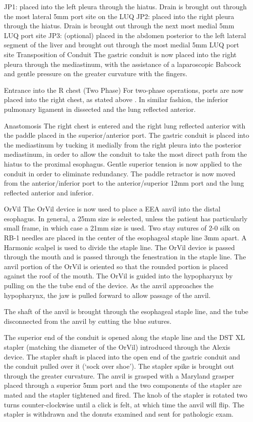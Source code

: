 \documentclass[
]{book}
\begin{document}
JP1: placed into the left pleura through the hiatus. Drain is brought out through the most lateral 5mm port site on the LUQ
JP2: placed into the right pleura through the hiatus. Drain is brought out through the next most medial 5mm LUQ port site
JP3: (optional) placed in the abdomen posterior to the left lateral segment of the liver and brought out through the most medial 5mm LUQ port site
Transposition of Conduit
The gastric conduit is now placed into the right pleura through the mediastinum, with the assistance of a laparoscopic Babcock and gentle pressure on the greater curvature with the fingers.

Entrance into the R chest (Two Phase)
For two-phase operations, ports are now placed into the right chest, as stated above . In similar fashion, the inferior pulmonary ligament in dissected and the lung reflected anterior.

Anastomosis
The right chest is entered and the right lung reflected anterior with the paddle placed in the superior/anterior port. The gastric conduit is placed into the mediastinum by tucking it medially from the right pleura into the posterior mediastinum, in order to allow the conduit to take the most direct path from the hiatus to the proximal esophagus. Gentle superior tension is now applied to the conduit in order to eliminate redundancy. The paddle retractor is now moved from the anterior/inferior port to the anterior/superior 12mm port and the lung reflected anterior and inferior.

OrVil
The OrVil device is now used to place a EEA anvil into the distal esophagus. In general, a 25mm size is selected, unless the patient has particularly small frame, in which case a 21mm size is used. Two stay sutures of 2-0 silk on RB-1 needles are placed in the center of the esophageal staple line 3mm apart. A Harmonic scalpel is used to divide the staple line. The OrVil device is passed through the mouth and is passed through the fenestration in the staple line. The anvil portion of the OrVil is oriented so that the rounded portion is placed against the roof of the mouth. The OrVil is guided into the hypopharynx by pulling on the the tube end of the device. As the anvil approaches the hypopharynx, the jaw is pulled forward to allow passage of the anvil.

The shaft of the anvil is brought through the esophageal staple line, and the tube disconnected from the anvil by cutting the blue sutures.

The superior end of the conduit is opened along the staple line and the DST XL stapler (matching the diameter of the OrVil) introduced through the Alexis device. The stapler shaft is placed into the open end of the gastric conduit and the conduit pulled over it (`sock over shoe'). The stapler spike is brought out through the greater curvature. The anvil is grasped with a Maryland grasper placed through a superior 5mm port and the two components of the stapler are mated and the stapler tightened and fired. The knob of the stapler is rotated two turns counter-clockwise until a click is felt, at which time the anvil will flip. The stapler is withdrawn and the donuts examined and sent for pathologic exam.
\end{document}
